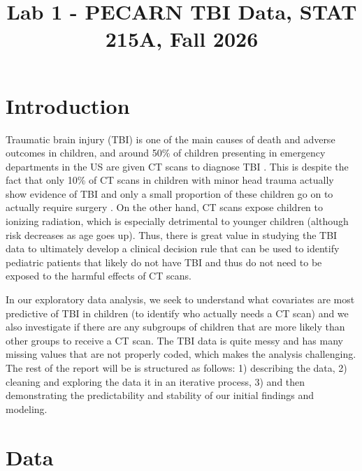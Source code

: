 \documentclass[10pt,letterpaper]{article}
\title{Lab 1 - PECARN TBI Data, STAT 215A, Fall 2026}
\begin{document}
\maketitle

\section{Introduction}\label{introduction}

Traumatic brain injury (TBI) is one of the main causes of death and adverse outcomes in children, and around 50\%
of children presenting in emergency departments in the US are given CT scans to diagnose TBI \cite{Kuppermann2009}. This is despite the fact that
only 10\% of CT scans in children with minor head trauma actually show evidence of TBI and only a small proportion of these children go on to actually require surgery \cite{Kuppermann2009}.
On the other hand, CT scans expose children to ionizing radiation, which is especially detrimental to younger children (although risk decreases as age goes up).
Thus, there is great value in studying the TBI data to ultimately develop a clinical decision rule that can be used to identify pediatric patients that likely do not have
TBI and thus do not need to be exposed to the harmful effects of CT scans.


In our exploratory data analysis, we seek to understand what covariates are most predictive of TBI in children (to identify who actually needs a CT scan) and we
also investigate if there are any subgroups of children that are more likely than other groups to receive a CT scan.
The TBI data is quite messy and has many missing values that are not properly coded, which makes the analysis challenging. The rest of the report will be
is structured as follows: 1) describing the data, 2) cleaning and exploring the data it in an iterative process, 3) and then demonstrating the predictability
and stability of our initial findings and modeling.


\section{Data}\label{data}
\end{document}
